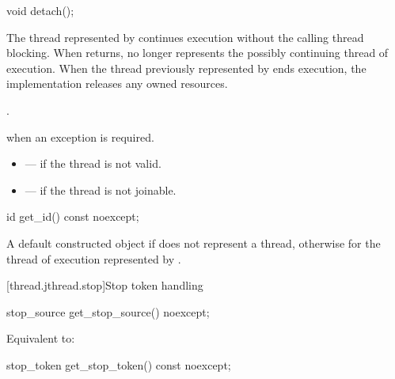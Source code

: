 %
\begin{itemdecl}
void detach();
\end{itemdecl}

\begin{itemdescr}
\pnum
\effects
The thread represented by  continues execution
without the calling thread blocking.
When  returns,
 no longer represents the possibly continuing thread of execution.
When the thread previously represented by  ends execution,
the implementation releases any owned resources.

\pnum
\ensures
{}.

\pnum
\throws
{} when an exception is required.

\pnum
\errors
\begin{itemize}
\item {} --- if the thread is not valid.
\item {} --- if the thread is not joinable.
\end{itemize}
\end{itemdescr}

%
\begin{itemdecl}
id get_id() const noexcept;
\end{itemdecl}

\begin{itemdescr}
\pnum
\returns
A default constructed  object
if  does not represent a thread,
otherwise 
for the thread of execution represented by .
\end{itemdescr}

[thread.jthread.stop]{Stop token handling}

%
\begin{itemdecl}
stop_source get_stop_source() noexcept;
\end{itemdecl}

\begin{itemdescr}
\pnum
\effects
Equivalent to: 
\end{itemdescr}

%
\begin{itemdecl}
stop_token get_stop_token() const noexcept;
\end{itemdecl}

